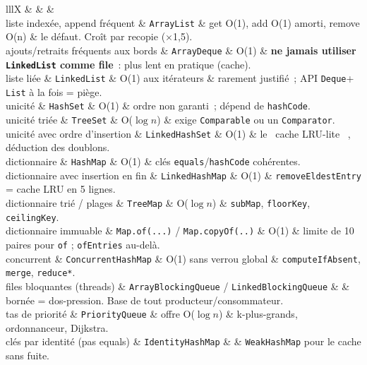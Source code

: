\begin{tabz}{lllX}
  \headrow {} \&  \&  \&  \\
  \midrule
  liste index\'ee, append fr\'equent \& \verb|ArrayList| \& get O(1), add O(1) amorti, remove O(n) \& le d\'efaut. Cro\^it par recopie ($\times$1{,}5). \\
  ajouts/retraits fr\'equents aux bords \& \verb|ArrayDeque| \& O(1) \& \textbf{ne jamais utiliser \verb|LinkedList| comme file}~: plus lent en pratique (cache). \\
  liste li\'ee \& \verb|LinkedList| \& O(1) aux it\'erateurs \& rarement justifi\'e~; API \verb|Deque|+ \verb|List| \`a la fois = pi\`ege. \\
  unicit\'e \& \verb|HashSet| \& O(1) \& ordre non garanti~; d\'epend de \verb|hashCode|. \\
  unicit\'e tri\'ee \& \verb|TreeSet| \& O($\log n$) \& exige \verb|Comparable| ou un \verb|Comparator|. \\
  unicit\'e avec ordre d'insertion \& \verb|LinkedHashSet| \& O(1) \& le \og ~cache LRU-lite~ \fg{}, d\'eduction des doublons. \\
  dictionnaire \& \verb|HashMap| \& O(1) \& cl\'es \verb|equals|/\verb|hashCode| coh\'erentes. \\
  dictionnaire avec insertion en fin \& \verb|LinkedHashMap| \& O(1) \& \verb|removeEldestEntry| = cache LRU en 5 lignes. \\
  dictionnaire tri\'e / plages \& \verb|TreeMap| \& O($\log n$) \& \verb|subMap|, \verb|floorKey|, \verb|ceilingKey|. \\
  dictionnaire immuable \& \verb|Map.of(...)| / \verb|Map.copyOf(..)| \& O(1) \& limite de 10 paires pour \verb|of| ; \verb|ofEntries| au-del\`a. \\
  concurrent \& \verb|ConcurrentHashMap| \& O(1) sans verrou global \& \verb|computeIfAbsent|, \verb|merge|, \verb|reduce*|. \\
  files bloquantes (threads) \& \verb|ArrayBlockingQueue| / \verb|LinkedBlockingQueue| \& \& born\'ee = dos-pression. Base de tout producteur/consommateur. \\
  tas de priorit\'e \& \verb|PriorityQueue| \& offre O($\log n$) \& k-plus-grands, ordonnanceur, Dijkstra. \\
  cl\'es par identit\'e (pas equals) \& \verb|IdentityHashMap| \& \& \verb|WeakHashMap| pour le cache sans fuite. \\
\end{tabz}

